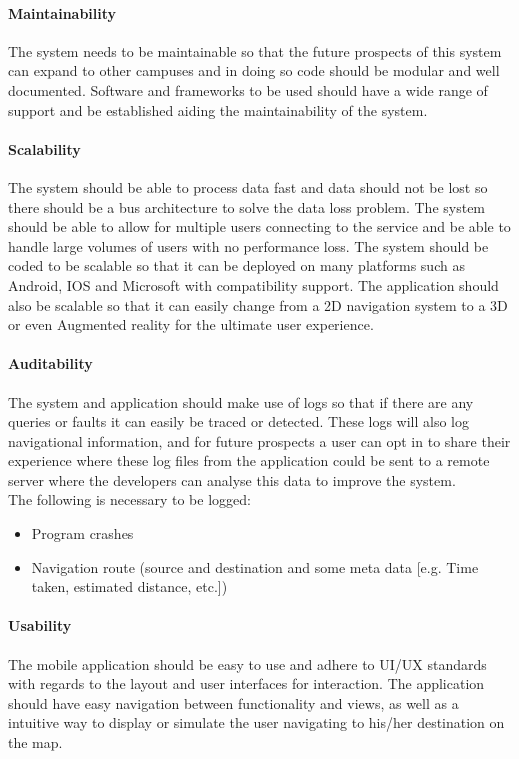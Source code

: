 \documentclass[runningheads,a4paper]{llncs}
\begin{document}
\paragraph{\textbf{Maintainability} \\}
 The system needs to be maintainable so that the future prospects of this system can expand to other campuses and in doing so code should be modular and well documented. Software and frameworks to be used should have a wide range of support and be established aiding the maintainability of the system.

\paragraph{\textbf{Scalability} \\}
 The system should be able to process data fast and data should not be lost so there should be a bus architecture to solve the data loss problem. The system should be able to allow for multiple users connecting to the service and be able to handle large volumes of users with no performance loss. The system should be coded to be scalable so that it can be deployed on many platforms such as Android, IOS and Microsoft with compatibility support. The application should also be scalable so that it can easily change from a 2D navigation system to a 3D or even Augmented reality for the ultimate user experience.

\paragraph{\textbf{Auditability} \\}
 The system and application should make use of logs so that if there are any  queries or faults it can easily be traced or detected. These logs will also log navigational information, and for future prospects a user can opt in to share their experience where these log files from the application could be sent to a remote server where the developers can analyse this data to improve the system. \\The following is necessary to be logged:
 \begin{itemize}
 	\item Program crashes
 	\item Navigation route (source and destination and some meta data [e.g. Time taken, estimated distance, etc.])
 \end{itemize}
 

\paragraph{\textbf{Usability} \\}
 The mobile application should be easy to use and adhere to UI/UX standards with regards to the layout and user interfaces for interaction. The application should have easy navigation between functionality and views, as well as a intuitive way to display or simulate the user navigating to his/her destination on the map.
 
\end{document}
